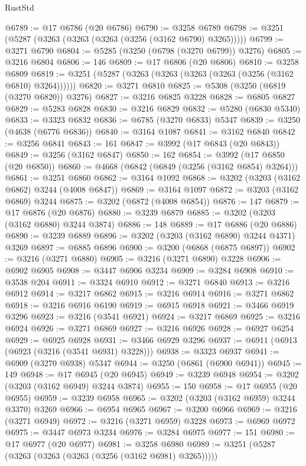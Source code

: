 \begin{lexlean}{RustStd}
\begin{coremodule}
@6789 := @17 @6786 (@20 @6786)
@6790 := @3258 @6789
@6798 := @3251 (@5287 (@3263 (@3263 (@3263 (@3256 (@3162 @6790) @3265)))))
@6799 := @3271 @6790
@6804 := @5285 (@3250 (@6798 (@3270 @6799)) @3276)
@6805 := @3216 @6804
@6806 := 146
@6809 := @17 @6806 (@20 @6806)
@6810 := @3258 @6809
@6819 := @3251 (@5287 (@3263 (@3263 (@3263 (@3263 (@3256 (@3162 @6810) @3264))))))
@6820 := @3271 @6810
@6825 := @5308 (@3250 (@6819 (@3270 @6820)) @3276)
@6827 := @3216 @6825 @3228
@6828 := @6805 @6827
@6829 := @5283 @6828
@6830 := @3216 @6829
@6832 := @5280 (@6830 @5340)
@6833 := @3323 @6832
@6836 := @6785 (@3270 @6833) @5347
@6839 := @3250 (@4638 (@6776 @6836))
@6840 := @3164 @1087
@6841 := @3162 @6840
@6842 := @3256 @6841
@6843 := 161
@6847 := @3992 (@17 @6843 (@20 @6843))
@6849 := @3256 (@3162 @6847)
@6850 := 162
@6854 := @3992 (@17 @6850 (@20 @6850))
@6860 := @4668 (@6842 (@6849 (@3256 (@3162 @6854) @3264)))
@6861 := @3251 @6860
@6862 := @3164 @1092
@6868 := @3202 (@3203 (@3162 @6862) @3244 (@4008 @6847))
@6869 := @3164 @1097
@6872 := @3203 (@3162 @6869) @3244
@6875 := @3202 (@6872 (@4008 @6854))
@6876 := 147
@6879 := @17 @6876 (@20 @6876)
@6880 := @3239 @6879
@6885 := @3202 (@3203 (@3162 @6880) @3244 @3874)
@6886 := 148
@6889 := @17 @6886 (@20 @6886)
@6890 := @3239 @6889
@6896 := @3202 (@3203 (@3162 @6890) @3244 @4371) @3269
@6897 := @6885 @6896
@6900 := @3200 (@6868 (@6875 @6897))
@6902 := @3216 (@3271 @6880)
@6905 := @3216 (@3271 @6890) @3228
@6906 := @6902 @6905
@6908 := @3447 @6906 @3234
@6909 := @3284 @6908
@6910 := @3538 @204
@6911 := @3324 @6910
@6912 := @3271 @6840
@6913 := @3216 @6912
@6914 := @3217 @6862
@6915 := @3216 @6914
@6916 := @3271 @6862
@6918 := @3216 @6916 @6190
@6919 := @6915 @6918
@6921 := @3466 @6919 @3296
@6923 := @3216 (@3541 @6921)
@6924 := @3217 @6869
@6925 := @3216 @6924
@6926 := @3271 @6869
@6927 := @3216 @6926
@6928 := @6927 @6254
@6929 := @6925 @6928
@6931 := @3466 @6929 @3296
@6937 := @6911 (@6913 (@6923 (@3216 (@3541 @6931) @3228)))
@6938 := @3323 @6937
@6941 := @6909 (@3270 @6938) @5347
@6944 := @3250 (@6861 (@6900 @6941))
@6945 := 149
@6948 := @17 @6945 (@20 @6945)
@6949 := @3239 @6948
@6954 := @3202 (@3203 (@3162 @6949) @3244 @3874)
@6955 := 150
@6958 := @17 @6955 (@20 @6955)
@6959 := @3239 @6958
@6965 := @3202 (@3203 (@3162 @6959) @3244 @3370) @3269
@6966 := @6954 @6965
@6967 := @3200 @6966
@6969 := @3216 (@3271 @6949)
@6972 := @3216 (@3271 @6959) @3228
@6973 := @6969 @6972
@6975 := @3447 @6973 @3234
@6976 := @3284 @6975
@6977 := 151
@6980 := @17 @6977 (@20 @6977)
@6981 := @3258 @6980
@6989 := @3251 (@5287 (@3263 (@3263 (@3263 (@3256 (@3162 @6981) @3265)))))

\end{coremodule}
\end{lexlean}
